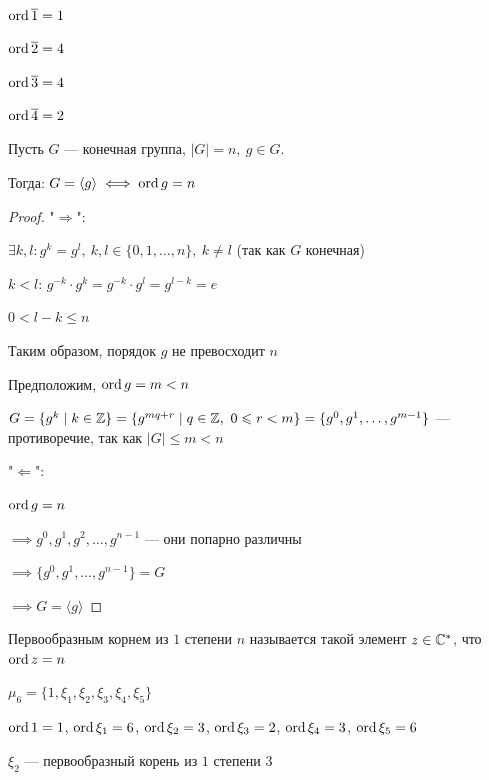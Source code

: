 \begin{normalsize}
\begin{example}
    $\operatorname{ord} \overline{1} = 1$

    $\operatorname{ord} \overline{2} = 4$
    
    $\operatorname{ord} \overline{3} = 4$
    
    $\operatorname{ord} \overline{4} = 2$
\end{example}

\begin{theorem-non}
    Пусть $G$ --- конечная группа, $|G| = n,~g \in G$.

    Тогда: $G = \langle g \rangle \iff \operatorname{ord} g = n$
\end{theorem-non}

\begin{proof}
    "$\Rightarrow$":

    $\exists k, l: g^k = g^l,~k, l \in \{0, 1, \ldots, n\},~k \neq l$ (так как $G$ конечная)

    $k < l$: $g^{-k} \cdot g^k = g^{-k} \cdot g^l = g^{l - k} = e$

    $0 < l - k \leq n$

    Таким образом, порядок $g$ не превосходит $n$

    Предположим, $\operatorname{ord} g = m < n$

    $G = \{ g^k \mid k \in \mathbb{Z} \} = \{ g^{mq + r} \mid q \in \mathbb{Z},~0 \leqslant r < m \} = \{g^0, g^1, \ldots, g^{m-1}\}$ --- противоречие, так как $|G| \leq m < n$

    "$\Leftarrow$":

    $\operatorname{ord} g = n$

    $\implies g^0, g^1, g^2, \ldots, g^{n - 1}$ --- они попарно различны

    $\implies \{g^0, g^1, \ldots, g^{n - 1}\} = G$

    $\implies G = \langle g \rangle$
\end{proof}

\begin{defn}
    Первообразным корнем из $1$ степени $n$ называется такой элемент $z \in \mathbb{C}^*$, что $\operatorname{ord} z = n$
\end{defn}

\begin{example}
    $\mu_6 = \{1, \xi_1, \xi_2, \xi_3, \xi_4, \xi_5\}$
    
    $\operatorname{ord} 1 = 1$, $\operatorname{ord} \xi_1 = 6$, $\operatorname{ord} \xi_2 = 3$, $\operatorname{ord} \xi_3 = 2$, $\operatorname{ord} \xi_4 = 3$, $\operatorname{ord} \xi_5 = 6$

    $\xi_2$ --- первообразный корень из $1$ степени $3$
\end{example}


\end{normalsize}
